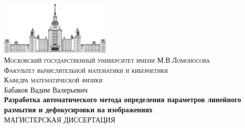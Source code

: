 \begin{titlepage}

\center %

{
\renewcommand{\headrulewidth}{0pt}
}

\thispagestyle{firststyle}



 \includegraphics[width=0.4\textwidth]{./pics/msu_logo}\\[0.2cm] %


\textsc{\small Московский государственный университет имени М.В.Ломоносова}\\ %
\textsc{\small Факультет вычислительной математики и кибернетики}\\ %
\textsc{\small Кафедра математической физики}\\[3cm] %

{
	Бабаков Вадим Валерьевич
} \\[1cm]
{ \Large \bfseries
	 Разработка автоматического метода определения параметров линейного размытия и дефокусировки на изображениях
} \\[1cm]
{ 
МАГИСТЕРСКАЯ  ДИССЕРТАЦИЯ
}\\[1.5cm] %
 


\end{titlepage}

